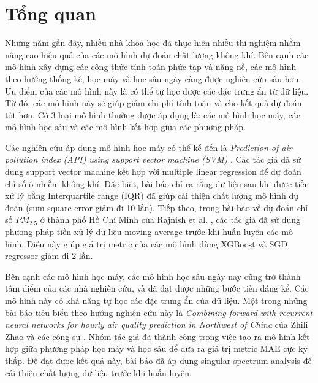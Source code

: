 \chapter{Tổng quan}
Những năm gần đây, nhiều nhà khoa học đã thực hiện nhiều thí nghiệm nhằm nâng cao hiệu quả của các mô hình dự đoán chất lượng không khí. Bên cạnh các mô hình xây dựng các công thức tính toán phức tạp và nặng nề, các mô hình theo hướng thống kê, học máy và học sâu ngày càng được nghiên cứu sâu hơn. Ưu điểm của các mô hình này là có thể tự học được các đặc trưng ẩn từ dữ liệu. Từ đó, các mô hình này sẽ giúp giảm chi phí tính toán và cho kết quả dự đoán tốt hơn. Có 3 loại mô hình thường được áp dụng là: các mô hình học máy, các mô hình học sâu và các mô hình kết hợp giữa các phương pháp.

Các nghiên cứu áp dụng mô hình học máy có thể kể đến là \textit{Prediction of air pollution index (API) using support vector machine (SVM)} \cite{LEONG2020103208}. Các tác giả đã sử dụng support vector machine kết hợp với multiple linear regression để dự đoán chỉ số ô nhiễm không khí. Đặc biệt, bài báo chỉ ra rằng dữ liệu sau khi được tiền xử lý bằng Interquartile range (IQR) đã giúp cải thiện chất lượng mô hình dự đoán (sum square error giảm đi 10 lần). Tiếp theo, trong bài báo về dự đoán chỉ số $PM_{2.5}$ ở thành phố Hồ Chí Minh của Rajnish et al. \cite{paper_bang}, các tác giả đã sử dụng phương pháp tiền xử lý dữ liệu moving average trước khi huấn luyện các mô hình. Điều này giúp giá trị metric của các mô hình dùng XGBoost và SGD regressor giảm đi 2 lần.

Bên cạnh các mô hình học máy, các mô hình học sâu ngày nay cũng trở thành tâm điểm của các nhà nghiên cứu, và đã đạt được những bước tiến đáng kể. Các mô hình này có khả năng tự học các đặc trưng ẩn của dữ liệu. Một trong những bài báo tiêu biểu theo hướng nghiên cứu này là \textit{Combining forward with recurrent neural networks for hourly air quality prediction in Northwest of China} của Zhili Zhao và các cộng sự \cite{ann-rnn}. Nhóm tác giả đã thành công trong việc tạo ra mô hình kết hợp giữa phương pháp học máy và học sâu để đưa ra giá trị metric MAE cực kỳ thấp. Để đạt được kết quả này, bài báo đã áp dụng singular spectrum analysis \cite{article-ssa} để cải thiện chất lượng dữ liệu trước khi huấn luyện.

